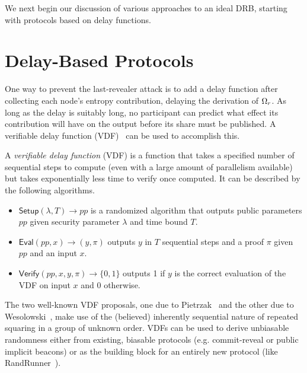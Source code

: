 We next begin our discussion of various approaches to an ideal DRB, starting with protocols based on delay functions.

\section{Delay-Based Protocols}
\label{section:delay}
One way to prevent the last-revealer attack is to add a delay function after collecting each node's entropy contribution, delaying the derivation of $\Omega_r$. As long as the delay is suitably long, no participant can predict what effect its contribution will have on the output before its share must be published. A verifiable delay function (VDF)~\cite{boneh2018verifiable,boneh2018survey} can be used to accomplish this.

\begin{definition}
A \textit{verifiable delay function} (VDF) is a function that takes a specified number of sequential steps to compute (even with a large amount of parallelism available) but takes exponentially less time to verify once computed. It can be described by the following algorithms.
\begin{itemize}
\item $\mathsf{Setup}(\lambda, T) \rightarrow pp$ is a randomized algorithm that outputs public parameters $pp$ given security parameter $\lambda$ and time bound $T$.
\item $\mathsf{Eval}(pp, x) \rightarrow (y, \pi)$ outputs $y$ in $T$ sequential steps and a proof $\pi$ given $pp$ and an input $x$.
\item $\mathsf{Verify}(pp, x, y, \pi) \rightarrow \{0, 1\}$ outputs 1 if $y$ is the correct evaluation of the VDF on input $x$ and 0 otherwise.
\end{itemize}
\end{definition}

The two well-known VDF proposals, one due to Pietrzak~\cite{pietrzak2018simple} and the other due to Wesolowski~\cite{wesolowski2019efficient}, make use of the (believed) inherently sequential nature of repeated squaring in a group of unknown order.
VDFs can be used to derive unbiasable randomness either from existing, biasable protocols (e.g. commit-reveal or public implicit beacons) or as the building block for an entirely new protocol (like RandRunner~\cite{schindler2021randrunner}).

